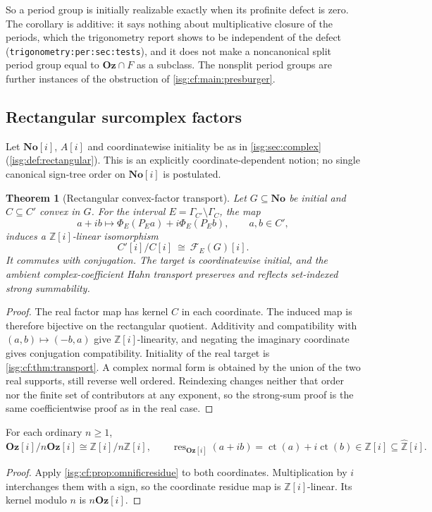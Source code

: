 \documentclass[11pt]{article}
\newtheorem{theorem}{Theorem}[section]
\theoremstyle{definition}
\theoremstyle{remark}
\newcommand{\No}{\ensuremath{\mathbf{No}}}
\newcommand{\Oz}{\ensuremath{\mathbf{Oz}}}
\newcommand{\Z}{\mathbb{Z}}
\newcommand{\ct}{\operatorname{ct}}
\newcommand{\Zhat}{\widehat{\Z}}
\newcommand{\res}{\operatorname{res}}
\newcommand{\replabel}[1]{\nolinkurl{#1}}
\begin{document}
So a period group is initially realizable exactly when its profinite
defect is zero. The corollary is additive: it says nothing about
multiplicative closure of the periods, which the trigonometry report
shows to be independent of the defect
(\replabel{trigonometry:per:sec:tests}), and it does not make a
noncanonical split period group equal to $\Oz\cap F$ as a subclass. The
nonsplit period groups are further instances of the obstruction of
\cref{isg:cf:main:presburger}.

\subsection{Rectangular surcomplex factors}
Let $\No[i]$, $A[i]$ and coordinatewise initiality be as in
\cref{isg:sec:complex} (\cref{isg:def:rectangular}). This is an
explicitly coordinate-dependent notion; no single canonical sign-tree
order on $\No[i]$ is postulated.

\begin{theorem}[Rectangular convex-factor transport]\label{isg:cf:thm:complex}
Let $G\subseteq\No$ be initial and $C\subseteq C'$ convex in $G$.
For the interval $E=\Gamma_{C'}\setminus\Gamma_C$, the map
\[
 a+ib\longmapsto\Phi_E(P_Ea)+i\Phi_E(P_Eb),
 \qquad a,b\in C',
\]
induces a $\Z[i]$-linear isomorphism
\[
 C'[i]/C[i]\ \cong\ \mathcal F_E(G)[i].
\]
It commutes with conjugation. The target is coordinatewise initial, and
the ambient complex-coefficient Hahn transport preserves and reflects
set-indexed strong summability.
\end{theorem}
\begin{proof}
The real factor map has kernel $C$ in each coordinate. The induced
map is therefore bijective on the rectangular quotient. Additivity and
compatibility with $(a,b)\mapsto(-b,a)$ give $\Z[i]$-linearity, and
negating the imaginary coordinate gives conjugation compatibility.
Initiality of the real target is \cref{isg:cf:thm:transport}. A complex
normal form is obtained by the union of the two real supports, still
reverse well ordered. Reindexing changes neither that order nor the
finite set of contributors at any exponent, so the strong-sum proof is
the same coefficientwise proof as in the real case.
\end{proof}

\begin{proposition}\label{isg:cf:prop:gaussian}
For each ordinary $n\ge1$,
\[
 \Oz[i]/n\Oz[i]\cong\Z[i]/n\Z[i],\qquad
 \res_{\Oz[i]}(a+ib)=\ct(a)+i\ct(b)\in\Z[i]\subseteq\Zhat[i].
\]
\end{proposition}
\begin{proof}
Apply \cref{isg:cf:prop:omnificresidue} to both coordinates.
Multiplication by $i$ interchanges them with a sign, so the coordinate
residue map is $\Z[i]$-linear. Its kernel modulo $n$ is $n\Oz[i]$.
\end{proof}
\end{document}
